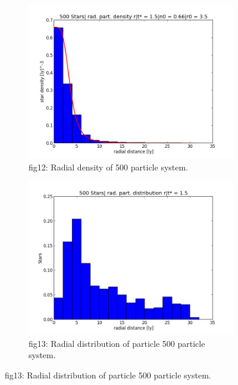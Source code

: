 \documentclass{article}
\begin{document}
\begin{figure}
\centering
\begin{subfigure}{.65\textwidth}
  \centering
  \hspace{-6cm}
  \includegraphics[scale=0.45]{g1-500.png}
  \caption{fig12: Radial density of 500 particle system.}
  \hspace{-6cm}
  \label{fig:sub1}
\end{subfigure}%
\begin{subfigure}{.65\textwidth}
  \hspace{-5cm}
  \centering
  \includegraphics[scale=0.45]{g2-500.png}
  \caption{fig13: Radial distribution of particle 500 particle system.}
  \label{fig:sub2}
\end{subfigure}
\label{fig:test}
\end{figure}
\end{document}
